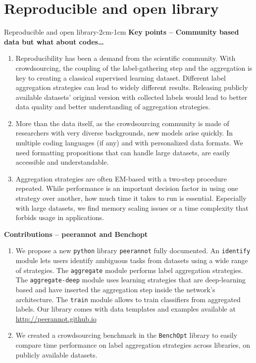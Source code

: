 \chapter{Reproducible and open library}
\label{chap:peerannot}
\enlargethispage{3\baselineskip}

\begin{keypointstwomargins}{Reproducible and open library}{-2cm}{-1cm}
        \textbf{Key points -- Community based data but what about codes\dots}
        \begin{enumerate}[leftmargin=*]
        \item Reproducibility has been a demand from the scientific community. With crowdsourcing, the coupling of the label-gathering step and the aggregation is key to creating a classical supervised learning dataset. Different label aggregation strategies can lead to widely different results. Releasing publicly available datasets' original version with collected labels would lead to better data quality and better understanding of aggregation strategies.
        \item More than the data itself, as the crowdsourcing community is made of researchers with very diverse backgrounds, new models arise quickly. In multiple coding languages (if any) and with personalized data formats. We need formatting propositions that can handle large datasets, are easily accessible and understandable.
        \item Aggregation strategies are often EM-based with a two-step procedure repeated. While performance is an important decision factor in using one strategy over another, how much time it takes to run is essential. Especially with large datasets, we find memory scaling issues or a time complexity that forbids usage in applications.
        \end{enumerate}

        \textbf{Contributions -- peerannot and Benchopt}
        \begin{enumerate}[leftmargin=*,start=4]
        \item We propose a new \texttt{python} library \texttt{peerannot} fully documented. An \texttt{identify} module lets users identify ambiguous tasks from datasets using a wide range of strategies. The \texttt{aggregate} module performs label aggregation strategies. The \texttt{aggregate-deep} module uses learning strategies that are deep-learning based and have inserted the aggregation step inside the network's architecture. The \texttt{train} module allows to train classifiers from aggregated labels. Our library comes with data templates and examples available at \url{http://peerannot.github.io}
        \item We created a crowdsourcing benchmark in the \texttt{BenchOpt} library to easily compare time performance on label aggregation strategies across libraries, on publicly available datasets.
        \end{enumerate}
\end{keypointstwomargins}

